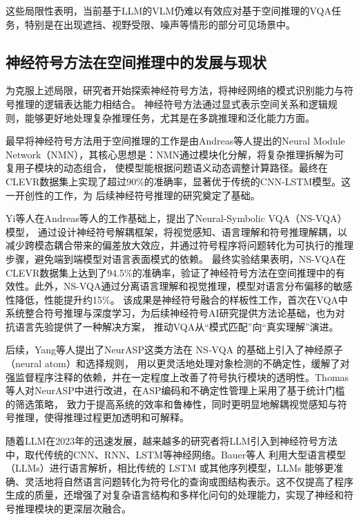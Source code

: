 这些局限性表明，当前基于LLM的VLM仍难以有效应对基于空间推理的VQA任务，特别是在出现遮挡、视野受限、噪声等情形的部分可见场景中。
\subsection{神经符号方法在空间推理中的发展与现状}
为克服上述局限，研究者开始探索神经符号方法，将神经网络的模式识别能力与符号推理的逻辑表达能力相结合。
神经符号方法通过显式表示空间关系和逻辑规则，能够更好地处理复杂推理任务，尤其是在多跳推理和泛化能力方面。

最早将神经符号方法用于空间推理的工作是由Andreas等人\cite{andreas2016neural}提出的Neural Module Network（NMN），其核心思想是：NMN通过模块化分解，将复杂推理拆解为可复用子模块的动态组合，
使模型能根据问题语义动态调整计算路径。最终在CLEVR数据集上实现了超过90\%的准确率，显著优于传统的CNN-LSTM模型。这一开创性的工作，为
后续神经符号推理的研究奠定了基础。

Yi等人\cite{yi2019neuralsymbolicvqadisentanglingreasoning}在Andreas等人的工作基础上，提出了Neural-Symbolic VQA（NS-VQA）模型，
通过设计神经符号解耦框架，将视觉感知、语言理解和符号推理解耦，以减少跨模态耦合带来的偏差放大效应，并通过符号程序将问题转化为可执行的推理步骤，避免端到端模型对语言表面模式的依赖。
最终实验结果表明，NS-VQA在CLEVR数据集上达到了94.5\%的准确率，验证了神经符号方法在空间推理中的有效性。此外，NS-VQA通过分离语言理解和视觉推理，模型对语言分布偏移的敏感性降低，性能提升约15\%。
该成果是神经符号融合的样板性工作，首次在VQA中系统整合符号推理与深度学习，为后续神经符号AI研究提供方法论基础，也为对抗语言先验提供了一种解决方案，
推动VQA从“模式匹配”向“真实理解”演进。

后续，Yang等人\cite{yang2020neurasp}提出了NeurASP这类方法在 NS‐VQA 的基础上引入了神经原子（neural atom）和选择规则，
用以更灵活地处理对象检测的不确定性，缓解了对强监督程序注释的依赖，并在一定程度上改善了符号执行模块的透明性。Thomas等人\cite{eiter2022neuro}对NeurASP中进行改进，在ASP编码和不确定性管理上采用了基于统计门槛的筛选策略，
致力于提高系统的效率和鲁棒性，同时更明显地解耦视觉感知与符号推理，使得推理过程更加透明和可解释。

随着LLM在2023年的迅速发展，越来越多的研究者将LLM引入到神经符号方法中，取代传统的CNN、RNN、LSTM等神经网络。Bauer\cite{bauer2023neuro}等人
利用大型语言模型（LLMs）进行语言解析，相比传统的 LSTM 或其他序列模型，LLMs 能够更准确、灵活地将自然语言问题转化为符号化的查询或图结构表示。这不仅提高了程序生成的质量，还增强了对复杂语言结构和多样化问句的处理能力，实现了神经和符号推理模块的更深层次融合。

